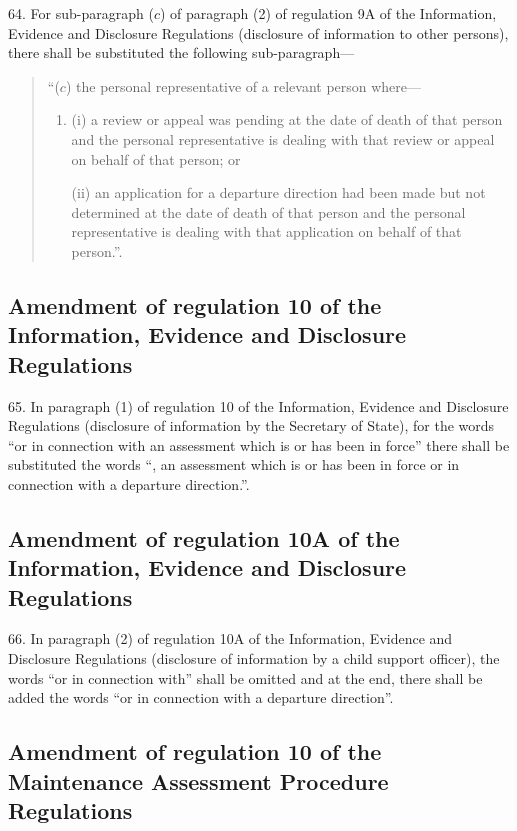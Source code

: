 \documentclass[12pt,a4paper]{article}
\begin{document}
64. For sub-paragraph ($c$) of paragraph (2) of regulation 9A of the
Information, Evidence and Disclosure Regulations (disclosure of information to
other persons), there shall be substituted the following sub-paragraph—
\begin{quotation}
“($c$) the personal representative of a relevant person where—
\begin{enumerate}\item[]
(i) a review or appeal was pending at the date of death of that person and the
personal representative is dealing with that review or appeal on behalf of that
person; or

(ii) an application for a departure direction had been made but not determined at
the date of death of that person and the personal representative is dealing with
that application on behalf of that person.”.
\end{enumerate}
\end{quotation}

\subsection[65. Amendment of regulation 10 of the Information, Evidence and Disclosure
Regulations]{Amendment of regulation 10 of the Information, Evidence and Disclosure
Regulations}

65. In paragraph (1) of regulation 10 of the Information, Evidence
and Disclosure Regulations (disclosure of information by the Secretary of
State), for the words “or in connection with an assessment which is or has been
in force” there shall be substituted the words “, an assessment which is or has
been in force or in connection with a departure direction.”.

\subsection[66. Amendment of regulation 10A of the Information, Evidence and Disclosure
Regulations]{\sloppy Amendment of regulation 10A of the Information, Evidence and Disclosure
Regulations}

66. In paragraph (2) of regulation 10A of the Information, Evidence
and Disclosure Regulations (disclosure of information by a child support
officer), the words “or in connection with” shall be omitted and at the end,
there shall be added the words “or in connection with a departure direction”.

\subsection[67. Amendment of regulation 10 of the Maintenance Assessment Procedure
Regulations]{Amendment of regulation 10 of the Maintenance Assessment Procedure
Regulations}
\end{document}
